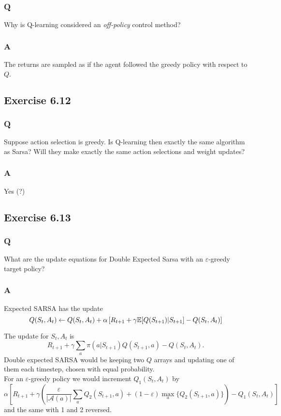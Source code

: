 \subsubsection*{Q}
Why is Q-learning considered an \emph{off-policy} control method?

\subsubsection*{A}
The returns are sampled as if the agent followed the greedy policy with respect to $Q$.

\subsection{Exercise 6.12}
\subsubsection*{Q}
Suppose action selection is greedy. Is Q-learning then exactly the same algorithm as Sarsa? Will they make exactly the same action selections and weight updates?
\subsubsection*{A}
Yes (?)

\subsection{Exercise 6.13}
\subsubsection*{Q}
What are the update equations for Double Expected Sarsa with an $\varepsilon$-greedy target policy?
\subsubsection*{A}
Expected SARSA has the update 
\[
    Q(S_t, A_t) \leftarrow Q(S_t, A_t) + \alpha \left[ R_{t+1} + \gamma \mathbb{E}{}[Q(S_{t+1}) | S_{t+1}] - Q(S_t, A_t)\right]
\]

The update for $S_t, A_t$ is 
\[
    R_{t+1} + \gamma \sum_a \pi(a|S_{t+1}) Q(S_{t+1}, a) - Q(S_t, A_t).
\]
Double expected SARSA would be keeping two $Q$ arrays and updating one of them each timestep, chosen with equal probability.\\

For an $\varepsilon$-greedy policy we would increment $Q_1(S_t, A_t)$ by
\begin{equation}
    \alpha \left[ R_{t+1} + \gamma \left( \frac{\varepsilon}{|\mathcal{A}(a)|} \sum_a Q_2(S_{t+1}, a) + (1-\varepsilon)\max_a\{Q_2(S_{t+1}, a)\} \right) - Q_1(S_t, A_t)  \right]
\end{equation}
and the same with 1 and 2 reversed.


